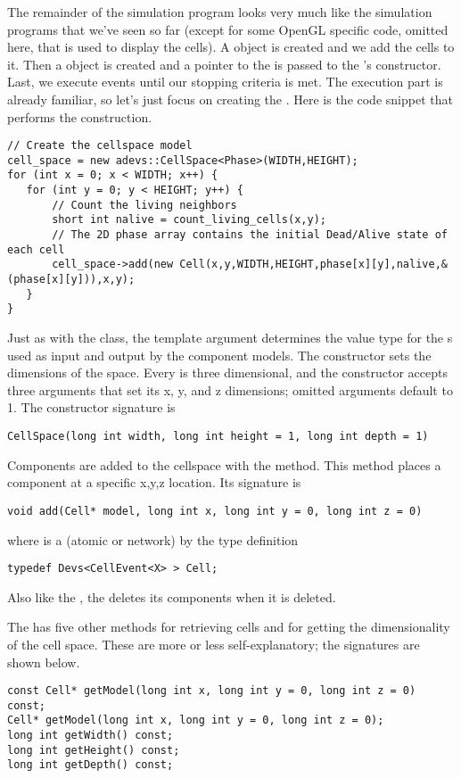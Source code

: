 The remainder of the simulation program looks very much like the simulation programs that we've seen so far (except for some OpenGL specific code, omitted here, that is used to display the cells). A  object is created and we add the cells to it. Then a  object is created and a pointer to the  is passed to the 's constructor. Last, we execute events until our stopping criteria is met. The execution part is already familiar, so let's just focus on creating the . Here is the code snippet that performs the construction.
\begin{verbatim}
// Create the cellspace model
cell_space = new adevs::CellSpace<Phase>(WIDTH,HEIGHT);
for (int x = 0; x < WIDTH; x++) {
   for (int y = 0; y < HEIGHT; y++) {
       // Count the living neighbors
       short int nalive = count_living_cells(x,y);
       // The 2D phase array contains the initial Dead/Alive state of each cell
       cell_space->add(new Cell(x,y,WIDTH,HEIGHT,phase[x][y],nalive,&(phase[x][y])),x,y);
   }
}
\end{verbatim}
Just as with the  class, the  template argument determines the value type for the s used as input and output by the component models. The  constructor sets the dimensions of the space. Every  is three dimensional, and the constructor accepts three arguments that set its x, y, and z dimensions; omitted arguments default to 1. The constructor signature is
\begin{verbatim}
CellSpace(long int width, long int height = 1, long int depth = 1)
\end{verbatim}

Components are added to the cellspace with the  method. This method places a component at a specific x,y,z location. Its signature is
\begin{verbatim}
void add(Cell* model, long int x, long int y = 0, long int z = 0)
\end{verbatim}
where  is a  (atomic or network) by the type definition
\begin{verbatim}
typedef Devs<CellEvent<X> > Cell;
\end{verbatim}
Also like the , the  deletes its components when it is deleted.

The  has five other methods for retrieving cells and for getting the dimensionality of the cell space. These are more or less self-explanatory; the signatures are shown below.
\begin{verbatim}
const Cell* getModel(long int x, long int y = 0, long int z = 0) const;
Cell* getModel(long int x, long int y = 0, long int z = 0);
long int getWidth() const;
long int getHeight() const;
long int getDepth() const;
\end{verbatim}

